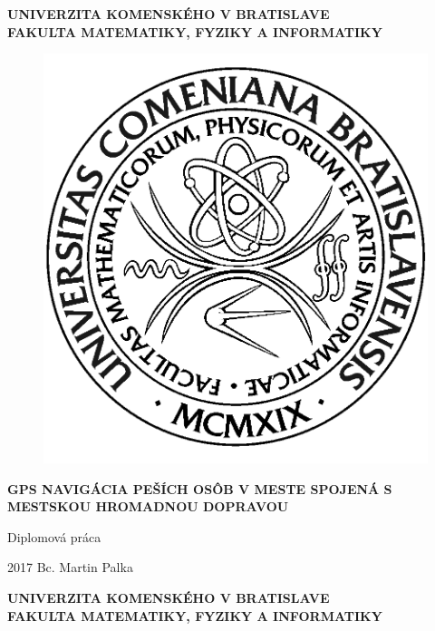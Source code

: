 \documentclass[12pt, a4paper, oneside]{book}
\newcommand\mftitle{GPS navigácia peších osôb v meste
	spojená s mestskou hromadnou
	dopravou}
\newcommand\mfthesistype{Diplomová práca}
\newcommand\mfauthor{Bc. Martin Palka}
\newcommand\mfuniversity{UNIVERZITA KOMENSKÉHO V BRATISLAVE}
\newcommand\mffaculty{FAKULTA MATEMATIKY, FYZIKY A INFORMATIKY}
\begin{document}
\frontmatter

\thispagestyle{empty}

\noindent
\begin{minipage}{\textwidth}
\begin{center}
\textbf{\mfuniversity \\
\mffaculty}
\end{center}
\end{minipage}

\vfill
\begin{figure}[!hbt]
	\begin{center}
		\includegraphics{images/logo_fmph}
		\label{img:logo}
	\end{center}
\end{figure}
\begin{center}
	\begin{minipage}{0.8\textwidth}
		\centerline{\textbf{\Large\MakeUppercase{\mftitle}}}
		\smallskip
		\centerline{\mfthesistype}
	\end{minipage}
\end{center}
\vfill
2017 \hfill
\mfauthor
\eject 

\thispagestyle{empty}

\noindent
\begin{minipage}{\textwidth}
\begin{center}
\textbf{\mfuniversity \\
\mffaculty}
\end{center}
\end{minipage}
\end{document}
